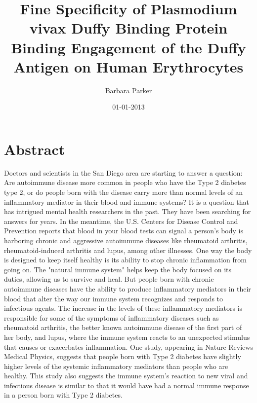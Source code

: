\documentclass{article}%
\title{Fine Specificity of Plasmodium vivax Duffy Binding Protein Binding Engagement of the Duffy Antigen on Human Erythrocytes}%
\author{Barbara Parker}%
\affil{INSERM, U895 (quipe 1), Equipe lablise Ligue Contre le Cancer, C3M, 06204 Nice, France}%
\date{01{-}01{-}2013}%
\begin{document}
%
\normalsize%
\maketitle%
\section{Abstract}%
\label{sec:Abstract}%
Doctors and scientists in the San Diego area are starting to answer a question: Are autoimmune disease more common in people who have the Type 2 diabetes type 2, or do people born with the disease carry more than normal levels of an inflammatory mediator in their blood and immune systems?\newline%
It is a question that has intrigued mental health researchers in the past. They have been searching for answers for years.\newline%
In the meantime, the U.S. Centers for Disease Control and Prevention reports that blood in your blood tests can signal a person's body is harboring chronic and aggressive autoimmune diseases like rheumatoid arthritis, rheumatoid{-}induced arthritis and lupus, among other illnesses.\newline%
One way the body is designed to keep itself healthy is its ability to stop chronic inflammation from going on.\newline%
The "natural immune system" helps keep the body focused on its duties, allowing us to survive and heal.\newline%
But people born with chronic autoimmune diseases have the ability to produce inflammatory mediators in their blood that alter the way our immune system recognizes and responds to infectious agents.\newline%
The increase in the levels of these inflammatory mediators is responsible for some of the symptoms of inflammatory diseases such as rheumatoid arthritis, the better known autoimmune disease of the first part of her body, and lupus, where the immune system reacts to an unexpected stimulus that causes or exacerbates inflammation.\newline%
One study, appearing in Nature Reviews Medical Physics, suggests that people born with Type 2 diabetes have slightly higher levels of the systemic inflammatory mediators than people who are healthy.\newline%
This study also suggests the immune system's reaction to new viral and infectious disease is similar to that it would have had a normal immune response in a person born with Type 2 diabetes.\newline%
\end{document}
